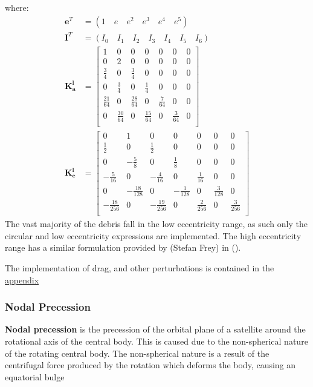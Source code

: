 \documentclass{article}
\newcommand{\boldindex}[1]{%
	\textbf{#1}\index{#1}%
}
\begin{document}
where:\begin{align}
	 \boldsymbol{e}^T &=(1\quad  e\quad e^2\quad e^3\quad e^4\quad e^5)\\
	\boldsymbol{I}^T &=(I_0\quad  I_1\quad I_2\quad I_3\quad I_4\quad I_5\quad I_6)\\
	\boldsymbol{K_a^l} &= \begin{bmatrix}
		1 & 0 & 0 & 0 &0&0 &0\\
		0 & 2 & 0 & 0 &0&0 &0\\
		\frac{3}{4} & 0 & \frac{3}{4} & 0 &0&0 &0\\
		0 & \frac{3}{4} & 0 & \frac{1}{4} &0&0 &0\\
	    \frac{21}{64} & 0 & \frac{28}{64} & 0 &\frac{7}{64}&0 &0\\
	    0 & \frac{30}{64} & 0 & \frac{15}{64} &0&\frac{3}{64} &0\\
	\end{bmatrix}\\
	\boldsymbol{K_e^l} &= \begin{bmatrix}
		0 & 1 & 0 & 0 &0&0 &0\\
		\frac{1}{2} & 0 & \frac{1}{2} & 0 &0&0 &0\\
		0 & -\frac{5}{8}  & 0 & \frac{1}{8}  &0&0 &0\\
		-\frac{5}{16}  & 0 & -\frac{4}{16}  &0 &\frac{1}{16} &0 &0\\
		0 & -\frac{18}{128} & 0& -\frac{1}{128}  &0&\frac{3}{128}  &0\\
		-\frac{18}{256}  & 0 & -\frac{19}{256}  & 0 &\frac{2}{256} &0 &\frac{3}{256} \\
	\end{bmatrix}
\end{align}
The vast majority of the debris fall in the low eccentricity range, as such only the circular and low eccentricity expressions are implemented. The high eccentricity range has a similar formulation provided by (Stefan Frey) in ().

The implementation of drag, and other perturbations is contained in the \hyperref[subsec:perts]{appendix}

\subsubsection{Nodal Precession}

\boldindex{Nodal precession} is the precession of the orbital plane of a satellite around the rotational axis of the central body. This is caused due to the non-spherical nature of the rotating central body. The non-spherical nature is a result of the centrifugal force produced by the rotation which  deforms the body, causing an equatorial bulge
\end{document}
